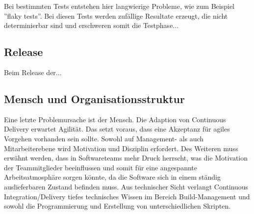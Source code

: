 Bei bestimmten Tests entstehen hier langwierige Probleme, wie zum Beispiel ''flaky tests''. Bei diesen Tests werden zufällige Resultate erzeugt, die nicht determinierbar sind und erschweren somit die Testphase...


\subsection{Release}

Beim Release der... 


\subsection{Mensch und Organisationsstruktur}
Eine letzte Problemursache ist der Mensch. Die Adaption von Continuous Delivery erwartet Agilität. Das setzt voraus, dass eine Akzeptanz für agiles Vorgehen vorhanden sein sollte. Sowohl auf Management- als auch Mitarbeiterebene wird Motivation und Disziplin erfordert. Des Weiteren muss erwähnt werden, dass in Softwareteams mehr Druck herrscht, was die Motivation der Teammitglieder beeinflussen und somit für eine angespannte Arbeitsatmosphäre sorgen könnte, da die Software sich in einem ständig auslieferbaren Zustand befinden muss. Aus technischer Sicht verlangt Continuous Integration/Delivery tiefes technisches Wissen im Bereich Build-Management und sowohl die Programmierung und Erstellung von unterschiedlichen Skripten. 
